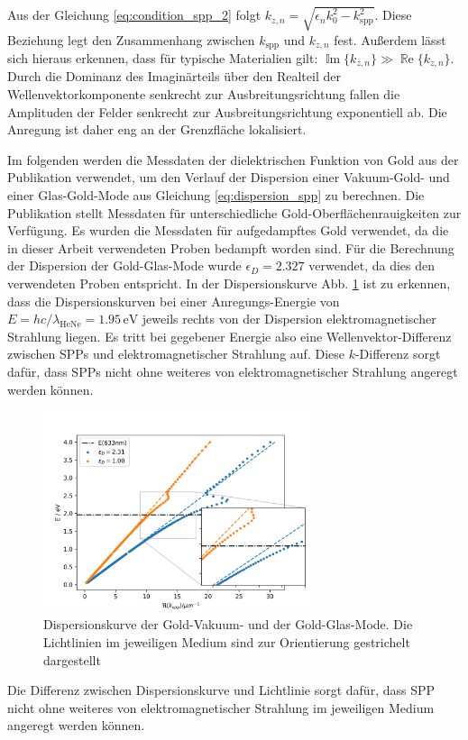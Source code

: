 \documentclass[titlepage,  ngerman]{article}
\renewcommand{\Re}{\operatorname{\mathbb{R}e}}
\renewcommand{\Im}{\operatorname{\mathbb{I}m}}
\begin{document}
	Aus der Gleichung \eqref{eq:condition_spp_2} folgt $k_{z, n} = \sqrt{\epsilon_n k_0^2 - k_{\mathrm{spp}}^2}$. Diese Beziehung legt den Zusammenhang zwischen $k_{\mathrm{spp}}$ und $k_{z, n}$ fest. Außerdem lässt sich hieraus erkennen, dass für typische Materialien gilt: $ \Im\{k_{z, n}\} \gg \Re\{k_{z, n}\}$. Durch die Dominanz des Imaginärteils über den Realteil der Wellenvektorkomponente senkrecht zur Ausbreitungsrichtung fallen die Amplituden der Felder senkrecht zur Ausbreitungsrichtung exponentiell ab. Die Anregung ist daher eng an der Grenzfläche lokalisiert. 
	
	Im folgenden werden die Messdaten der dielektrischen Funktion von Gold aus der Publikation \cite{Olmon.2012} verwendet, um den Verlauf der Dispersion einer Vakuum-Gold- und einer Glas-Gold-Mode aus Gleichung \eqref{eq:dispersion_spp} zu berechnen.  Die Publikation stellt Messdaten für unterschiedliche Gold-Oberflächenrauigkeiten zur Verfügung. Es wurden die Messdaten für aufgedampftes Gold verwendet, da die in dieser Arbeit verwendeten Proben bedampft worden sind. Für die Berechnung der Dispersion der Gold-Glas-Mode wurde $\epsilon_D = 2.327$ \cite{Zeiss.} verwendet, da dies den verwendeten Proben entspricht. In der Dispersionskurve Abb. \ref{fig:dispersion_spp} ist zu erkennen, dass die Dispersionskurven bei einer Anregungs-Energie von $E = hc/\lambda_{\mathrm{HeNe}}= 1.95\,\mathrm{eV}$ jeweils rechts von der Dispersion elektromagnetischer Strahlung liegen. Es tritt bei gegebener Energie also eine Wellenvektor-Differenz zwischen SPPs und elektromagnetischer Strahlung auf. Diese $k$-Differenz sorgt dafür, dass SPPs nicht ohne weiteres von elektromagnetischer Strahlung angeregt werden können.
	\begin{figure}[h]		
		\centering
		\includegraphics[width=0.7\textwidth]{figures/dispersion.png}
		\caption[Dispersion SPP]{Dispersionskurve der Gold-Vakuum- und der Gold-Glas-Mode. Die Lichtlinien im jeweiligen Medium sind zur Orientierung gestrichelt dargestellt}
		\label{fig:dispersion_spp}		
	\end{figure}
	Die Differenz zwischen Dispersionskurve und Lichtlinie sorgt dafür, dass SPP nicht ohne weiteres von elektromagnetischer Strahlung im jeweiligen Medium angeregt werden können.	
\end{document}

